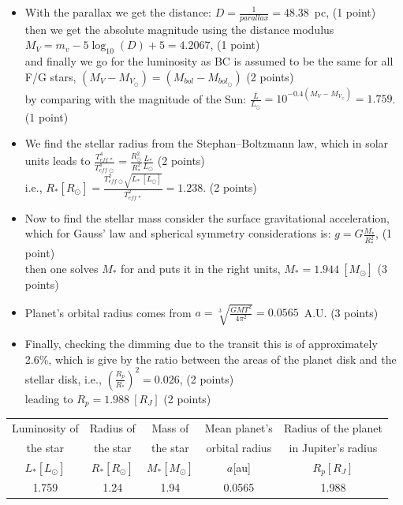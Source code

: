 \begin{itemize}
\item With the parallax we get the distance:
$D = \frac{1}{parallax} = 48.38$~pc, \hfill(1 point)\\
then we get the absolute magnitude using the distance modulus
$M_V = m_v - 5\log_{10}(D) + 5 = 4.2067$, \hfill(1 point)\\
and finally we go for the luminosity as BC is assumed to be the same for all
F/G stars, $(M_V - M_{V_\odot}) = (M_{bol} - M_{bol_\odot})$ \hfill(2 points)\\
by comparing with the magnitude of the Sun:
$\frac{L}{L_\odot} = 10^{-0.4(M_V - M_{V_\odot})} = 1.759$. \hfill(1 point)
\item We find the stellar radius from the Stephan--Boltzmann
law, which in solar units leads to
$\frac{T_{eff\,*}^4}{T_{eff\,\odot}^4}
 = \frac{R_\odot^2}{R_*^2}\frac{L_*}{L_\odot}$ \hfill(2 points)\\
i.e.,
$R_*[R_\odot] = \frac{T_{eff\,\odot}^2\sqrt{L_*\,[L_\odot]}}{T_{eff\,*}^2}
 = 1.238$. \hfill(2 points)
\item Now to find the stellar mass consider the surface gravitational
acceleration, which for Gauss' law and spherical symmetry considerations is:
$g = G\frac{M_*}{R_*^2}$, \hfill(1 point)\\
then one solves $M_*$ for and puts it in the right units,
$M_* = 1.944\ [M_\odot]$ \hfill(3 points)
\item Planet's orbital radius comes from
$a = \sqrt[3]{\frac{GMT^2}{4\pi^2}} = 0.0565$~A.U. \hfill(3 points)
\item Finally, checking the dimming due to the transit this is of
approximately 2.6\%, which is give
by the ratio between the areas of the planet disk and the stellar disk, i.e.,
$\left(\frac{R_p}{R_*}\right)^2 = 0.026$, \hfill(2 points)\\
leading to $R_p = 1.988\ [R_J]$ \hfill(2 points)
\end{itemize}

\begin{center}
\begin{tabular}{ccccc}
\toprule
Luminosity of & Radius of & Mass of & Mean planet's & Radius of the planet\\
the star & the star & the star & orbital radius & in Jupiter's radius\\
$L_*[L_\odot]$ & $R_*[R_\odot]$ & $M_*[M_\odot]$ & $a$[au] & $R_p[R_J]$\\
\midrule
1.759 & 1.24 & 1.94 & 0.0565 & 1.988\\
\bottomrule
\end{tabular}
\end{center}

